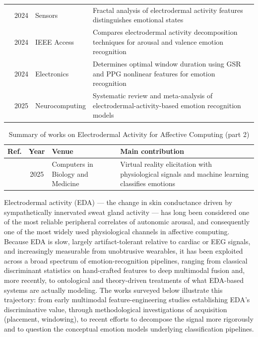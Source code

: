 \begin{table}[!t]
\begin{tabularx}{\textwidth}{@{}l c p{3.6cm} X@{}}
\cite{diaz2024fractal} & 2024 & Sensors & Fractal analysis of electrodermal activity features distinguishes emotional states \\
\cite{veeranki2024comparison} & 2024 & IEEE Access & Compares electrodermal activity decomposition techniques for arousal and valence emotion recognition \\
\cite{bamonte2024determining} & 2024 & Electronics & Determines optimal window duration using GSR and PPG nonlinear features for emotion recognition \\
\cite{damelio2025emotion} & 2025 & Neurocomputing & Systematic review and meta-analysis of electrodermal-activity-based emotion recognition models \\
\bottomrule
\end{tabularx}
\end{table}

\begin{table}[!t]
\centering
\renewcommand{\arraystretch}{1.2}
\caption{Summary of works on Electrodermal Activity for Affective Computing (part 2)}
\begin{tabularx}{\textwidth}{@{}l c p{3.6cm} X@{}}
\toprule
\textbf{Ref.} & \textbf{Year} & \textbf{Venue} & \textbf{Main contribution} \\
\midrule
\cite{polo2025advancing} & 2025 & Computers in Biology and Medicine & Virtual reality elicitation with physiological signals and machine learning classifies emotions \\
\bottomrule
\end{tabularx}
\end{table}

Electrodermal activity (EDA) --- the change in skin conductance driven by sympathetically innervated sweat gland activity --- has long been considered one of the most reliable peripheral correlates of autonomic arousal, and consequently one of the most widely used physiological channels in affective computing. Because EDA is slow, largely artifact-tolerant relative to cardiac or EEG signals, and increasingly measurable from unobtrusive wearables, it has been exploited across a broad spectrum of emotion-recognition pipelines, ranging from classical discriminant statistics on hand-crafted features to deep multimodal fusion and, more recently, to ontological and theory-driven treatments of what EDA-based systems are actually modeling. The works surveyed below illustrate this trajectory: from early multimodal feature-engineering studies establishing EDA's discriminative value, through methodological investigations of acquisition (placement, windowing), to recent efforts to decompose the signal more rigorously and to question the conceptual emotion models underlying classification pipelines.

